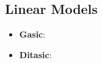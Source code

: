 \subsection{Linear Models}
\begin{itemize}
    \item \textbf{Gasic}:
    \item \textbf{Ditasic}:
\end{itemize}
